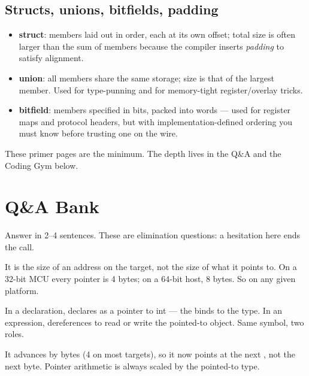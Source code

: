 \subsection{Structs, unions, bitfields, padding}

\begin{itemize}
\item \textbf{struct}: members laid out in order, each at its own offset;
  total size is often larger than the sum of members because the compiler
  inserts \emph{padding} to satisfy alignment.
\item \textbf{union}: all members share the same storage; size is that of the
  largest member. Used for type-punning and for memory-tight
  register/overlay tricks.
\item \textbf{bitfield}: members specified in bits, packed into words --- used
  for register maps and protocol headers, but with implementation-defined
  ordering you must know before trusting one on the wire.
\end{itemize}

These primer pages are the minimum. The depth lives in the Q\&A and the
Coding Gym below.

\section{Q\&A Bank}

%
{Answer in 2--4 sentences. These are elimination questions: a hesitation here
ends the call.}

It is the size of an address on the target, not the size of what it points
to. On a 32-bit MCU every pointer is 4 bytes; on a 64-bit host, 8 bytes. So
 on any given platform.

In a declaration,  declares  as a pointer to int --- the
\code{*} binds to the type. In an expression,  dereferences 
to read or write the pointed-to object. Same symbol, two roles.

It advances  by  bytes (4 on most targets), so it
now points at the next , not the next byte. Pointer arithmetic is
always scaled by the pointed-to type.

